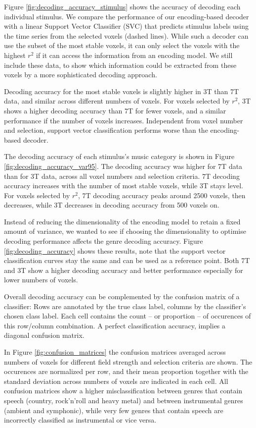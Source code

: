 Figure \ref{fig:decoding_accuracy_stimulus} shows the accuracy of decoding each
individual stimulus. We compare the performance of our encoding-based decoder
with a linear Support Vector Classifier (SVC) \citep{FCH+08,V13} that predicts
stimulus labels using the time series from the selected voxels (dashed lines).
While such a decoder can use the subset of the most stable
voxels, it can only select the voxels with the highest $r^2$ if it can access
the information from an encoding model. We still include these data, to show
which information could be extracted from these voxels by a more sophisticated
decoding approach. 

Decoding accuracy for the most stable voxels is slightly higher in 3T than 7T
data, and similar across different numbers of voxels. For voxels selected by
$r^2$, 3T shows a higher decoding accuracy than 7T for fewer voxels, and
a similar performance if the number of voxels increases.
Independent from voxel number and selection, support vector classification
performs worse than the encoding-based decoder.

The decoding accuracy of each stimulus's music category is shown in Figure
\ref{fig:decoding_accuracy_var95}.  The decoding accuracy was higher for 7T data than for
3T data, across all voxel numbers and selection criteria. 7T decoding
accuracy increases with the number of most stable voxels, while 3T stays level.
For voxels selected by $r^2$, 7T decoding accuracy peaks around 2500 voxels,
then decreases, while 3T decreases in decoding accuracy from 500 voxels
on. 


Instead of reducing the dimensionality of the encoding model to retain a fixed
amount of variance, we wanted to see if choosing the dimensionality to optimise decoding
performance affects the genre decoding accuracy.
Figure \ref{fig:decoding_accuracy} shows these results, note that the support vector
classification curves stay the same and can be used as a reference point.
Both 7T and 3T show a higher decoding accuracy and better performance especially
for lower numbers of voxels. 

Overall decoding accuracy can be complemented by the confusion matrix of a
classifier: Rows are annotated by the true class label, columns by the
classifier's chosen class label. Each cell contains the count -- or proportion
-- of occurences of this row/column combination. A perfect classification
accuracy, implies a diagonal confusion matrix.

In Figure \ref{fig:confusion_matrices} the confusion matrices averaged across
numbers of voxels for different field strength and selection criteria are shown.
The occurences are normalized per row, and their mean proportion together with
the standard deviation across numbers of voxels are indicated in each cell. All
confusion matrices show a higher misclassification between genres that contain
speech (country, rock'n'roll and heavy metal) and between instrumental genres
(ambient and symphonic), while very few genres that contain speech are
incorrectly classified as instrumental or vice versa.

